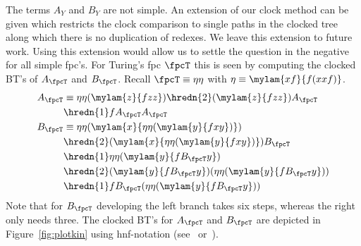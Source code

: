 The terms $A_Y$ and $B_Y$ are not simple.
An extension of our clock method can be given 
which restricts the clock comparison to single paths in the clocked \boehm{} tree
along which there is no duplication of redexes.
We leave this extension to future work.
Using this extension would allow us to settle 
the question in the negative for all simple fpc's.
For Turing's fpc $\fpcT$ this is seen by computing 
the clocked BT's of $A_{\fpcT}$ and $B_{\fpcT}$.
Recall $\fpcT \equiv \eta\eta$ with $\eta \equiv \mylam{xf}{f(xxf)}$.
\begin{align*}
  A_{\fpcT} 
  &\equiv \eta\eta(\mylam{z}{fzz})
  \hredn{2} (\mylam{z}{fzz}) A_{\fpcT} \\
  & \hredn{1} f A_{\fpcT} A_{\fpcT} \\
  B_{\fpcT} 
  &\equiv \eta\eta(\mylam{x}{\eta\eta(\mylam{y}{fxy})})
  \\
  &\hredn{2} 
  (\mylam{x}{\eta\eta(\mylam{y}{fxy})}) B_{\fpcT} \\
  &\hredn{1} 
  \eta\eta(\mylam{y}{f B_{\fpcT} y})
  \\
  &\hredn{2}
  (\mylam{y}{f B_{\fpcT} y})(\eta\eta(\mylam{y}{f B_{\fpcT} y}))
  \\
  &\hredn{1}
  f B_{\fpcT} (\eta\eta(\mylam{y}{f B_{\fpcT} y}))
\end{align*}
Note that for $B_{\fpcT}$ developing the left branch takes six steps,
whereas the right only needs three.
The clocked BT's for $A_{\fpcT}$ and $B_{\fpcT}$ are depicted in Figure~\ref{fig:plotkin}
using hnf-notation (see~\cite{bare:1984} or~\cite{bare:klop:2009}).

